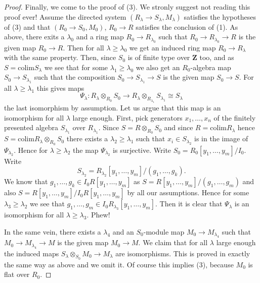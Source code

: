 \begin{proof}
\medskip\noindent
Finally, we come to the proof of (3). We stronly suggest not reading
this proof ever!
Assume the directed system $(R_\lambda \to S_\lambda, M_\lambda)$
satisfies the hypotheses of (3) and that
$(R_0 \to S_0, M_0)$, $R_0 \to R$ satisfies the conclusion of (1).
As above, there exits a $\lambda_0$ and a ring map
$R_0 \to R_{\lambda_0}$ such that $R_0 \to R_{\lambda_0} \to R$ is the
given map $R_0 \to R$. Then for all $\lambda \geq \lambda_0$
we get an induced ring map $R_0 \to R_\lambda$ with the same property.
Then, since $S_0$ is of finite type over $\mathbf{Z}$
too, and as $S = \text{colim} S_\lambda$ we see that for some
$\lambda_1 \geq \lambda_0$ we also get an $R_0$-algebra map
$S_0 \to S_{\lambda_1}$
such that the composition $S_0 \to S_{\lambda_1} \to S$ is the given
map $S_0 \to S$. For all $\lambda \geq \lambda_1$ this gives
maps
$$
\Psi_{\lambda} :
R_\lambda \otimes_{R_0} S_0
\longrightarrow
R_\lambda \otimes_{R_{\lambda_1}} S_{\lambda_1}
\cong
S_\lambda
$$
the last isomorphism by assumption. Let us argue that this map is an
isomorphism for all $\lambda$ large enough. First, pick generators
$x_1, \ldots, x_n$ of the finitely presented algebra $S_{\lambda_1}$
over $R_{\lambda_1}$. Since $S = R \otimes_{R_0} S_0$ and since
$R = \text{colim} R_\lambda$ hence
$S = \text{colim} R_\lambda \otimes_{R_0} S_0$
there exists a $\lambda_2 \geq \lambda_1$ such
that $x_i \in S_{\lambda_2}$ is in the image of $\Psi_{\lambda_2}$.
Hence for $\lambda \geq \lambda_2$ the map $\Psi_{\lambda_2}$ is surjective.
Write $S_0 = R_0[y_1, \ldots, y_m]/I_0$. Write
$$
S_{\lambda_2} = R_{\lambda_2}[y_1, \ldots, y_m]/(g_1, \ldots, g_k).
$$
We know that $g_1, \ldots, g_k \in I_0R[y_1, \ldots, y_m]$
as $S = R[y_1, \ldots, y_m]/(g_1, \ldots, g_m)$ and also
$S = R[y_1, \ldots, y_m]/I_0R[y_1, \ldots, y_m]$ by all our assumptions.
Hence for some $\lambda_3 \geq \lambda_2$ we see that
$g_1, \ldots, g_m \in I_0R_{\lambda_3}[y_1, \ldots, y_m]$.
Then it is clear that $\Psi_{\lambda}$ is an isomorphism for
all $\lambda \geq \lambda_3$. Phew!

\medskip\noindent
In the same vein, there exists a $\lambda_4$ and an $S_0$-module map
$M_0 \to M_{\lambda_4}$ such that $M_0 \to M_{\lambda_4} \to M$ is the given
map $M_0 \to M$. We claim that for all $\lambda$ large enough
the induced maps $S_\lambda \otimes_{S_0} M_0 \to M_\lambda$ are isomorphisms.
This is proved in exactly the same way as above and we omit it.
Of course this implies (3), because $M_0$ is flat over $R_0$.
\end{proof}





